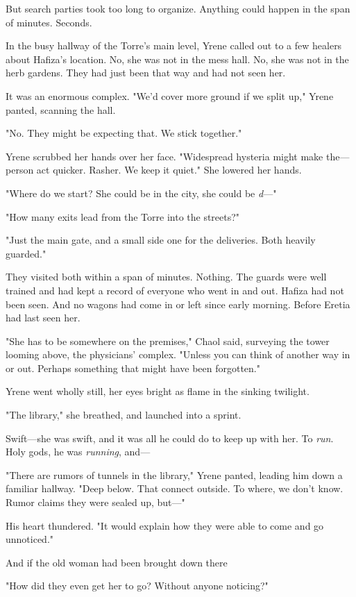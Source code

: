 But search parties took too long to organize. Anything could happen in the span of minutes. Seconds.

In the busy hallway of the Torre's main level, Yrene called out to a few healers about Hafiza's location. No, she was not in the mess hall. No, she was not in the herb gardens. They had just been that way and had not seen her.

It was an enormous complex. "We'd cover more ground if we split up," Yrene panted, scanning the hall.

"No. They might be expecting that. We stick together."

Yrene scrubbed her hands over her face. "Widespread hysteria might make the---person act quicker. Rasher. We keep it quiet." She lowered her hands.

"Where do we start? She could be in the city, she could be
\emph{d}---"

"How many exits lead from the Torre into the streets?"

"Just the main gate, and a small side one for the deliveries. Both heavily guarded."

They visited both within a span of minutes. Nothing. The guards were well trained and had kept a record of everyone who went in and out. Hafiza had not been seen. And no wagons had come in or left since early morning. Before Eretia had last seen her.

"She has to be somewhere on the premises," Chaol said, surveying the tower looming above, the physicians' complex. "Unless you can think of another way in or out. Perhaps something that might have been forgotten."

Yrene went wholly still, her eyes bright as flame in the sinking twilight.

"The library," she breathed, and launched into a sprint.

Swift---she was swift, and it was all he could do to keep up with her. To \emph{run}. Holy gods, he was \emph{running}, and---

"There are rumors of tunnels in the library," Yrene panted, leading him down a familiar hallway. "Deep below. That connect outside. To where, we don't know. Rumor claims they were sealed up, but---"

His heart thundered. "It would explain how they were able to come and go unnoticed."

And if the old woman had been brought down there 

"How did they even get her to go? Without anyone noticing?"

